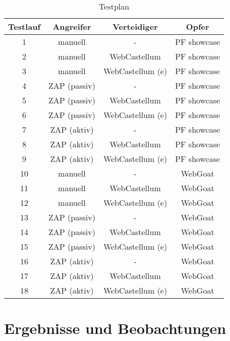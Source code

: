 \begin{table}[h]
    \centering
    \begin{tabular}{cccc} 
      \toprule
    \textbf{Testlauf} & \textbf{Angreifer} & \textbf{Verteidiger} & \textbf{Opfer} \\ 
     \midrule
      1 & manuell & - & PF showcase\\
      2 & manuell & WebCastellum & PF showcase \\
      3 & manuell & WebCastellum (e) & PF showcase \\
      4 & ZAP (passiv) & - & PF showcase\\
      5 & ZAP (passiv) & WebCastellum & PF showcase \\
      6 & ZAP (passiv) & WebCastellum (e) & PF showcase \\
      7 & ZAP (aktiv) & - & PF showcase\\
      8 & ZAP (aktiv) & WebCastellum & PF showcase \\
      9 & ZAP (aktiv) & WebCastellum (e) & PF showcase \\
      10 & manuell & - & WebGoat \\ 
      11 & manuell & WebCastellum & WebGoat \\
      12 & manuell & WebCastellum (e) & WebGoat \\
      13 & ZAP (passiv) & - & WebGoat \\ 
      14 & ZAP (passiv) & WebCastellum & WebGoat \\
      15 & ZAP (passiv) & WebCastellum (e) & WebGoat \\
      16 & ZAP (aktiv) & - & WebGoat \\ 
      17 & ZAP (aktiv) & WebCastellum & WebGoat \\
      18 & ZAP (aktiv) & WebCastellum (e) & WebGoat \\
   \bottomrule
    \end{tabular}
    \caption{Testplan}
    \label{tab:testplan}
\end{table}

\section{Ergebnisse und Beobachtungen}



